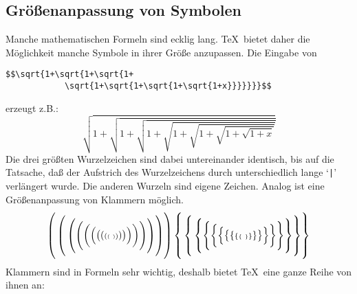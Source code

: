 \subsection{Gr\"o\ss{}enanpassung von Symbolen}
Manche mathematischen Formeln sind ecklig lang. \TeX\ bietet daher
die M\"oglichkeit manche Symbole in ihrer Gr\"o\ss{}e anzupassen. Die Eingabe
von
\begin{verbatim}
$$\sqrt{1+\sqrt{1+\sqrt{1+
            \sqrt{1+\sqrt{1+\sqrt{1+\sqrt{1+x}}}}}}}$$
\end{verbatim}
erzeugt z.B.:
$$\sqrt{1+\sqrt{1+\sqrt{1+
            \sqrt{1+\sqrt{1+\sqrt{1+\sqrt{1+x}}}}}}}$$
Die drei gr\"o\ss{}ten Wurzelzeichen sind dabei untereinander identisch, bis
auf die Tatsache, da\ss{} der Aufstrich des Wurzelzeichens durch
unterschiedlich lange `\verb+|+' verl\"angert wurde. Die anderen Wurzeln
sind eigene Zeichen. Analog ist eine Gr\"o\ss{}enanpassung von
Klammern
m\"oglich.
\[
\displaystyle
\left(\vbox to 27pt{}\left(\vbox to 24pt{}\left(\vbox to 21pt{}
\Biggl(\biggl(\Bigl(\bigl(({\scriptstyle({\scriptscriptstyle(\hskip3pt
)})})\bigr)\Bigr)\biggr)\Biggr)\right)\right)\right)
\left\{\vbox to 27pt{}\left\{\vbox to 24pt{}\left\{\vbox to 21pt{}
\Biggl\{\biggl\{\Bigl\{\bigl\{\{{\scriptstyle\{{\scriptscriptstyle\{\hskip3pt
\}}\}}\}\bigr\}\Bigr\}\biggr\}\Biggr\}\right\}\right\}\right\}
\]
Klammern sind in Formeln sehr wichtig, deshalb bietet \TeX\ eine ganze
Reihe von ihnen an:

